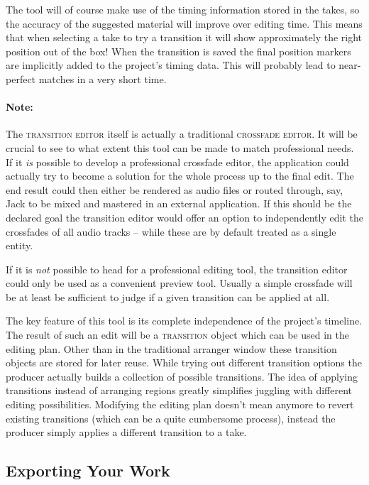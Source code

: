 \documentclass[11pt,a4paper]{article}
\newcommand*{\term}[1]{\textsc{#1}}
\begin{document}
The tool will of course make use of the timing information stored in the takes,
so the accuracy of the suggested material will improve over editing time.
This means that when selecting a take to try a transition it will show
approximately the right position out of the box!
When the transition is saved the final position markers are implicitly added
to the project's timing data. This will probably lead to near-perfect matches
in a very short time.

\paragraph{Note:}
The \term{transition editor} itself is actually a traditional \term{crossfade editor}.
It will be crucial to see to what extent this tool can be made to match
professional needs.
If it \emph{is} possible to develop a professional crossfade editor, the application
could actually try to become a solution for the whole process up to the final edit.
The end result could then either be rendered as audio files or routed through, say,
Jack to be mixed and mastered in an external application.
If this should be the declared goal the transition editor would offer an option to independently edit the crossfades of all audio tracks -- while these are by default
treated as a single entity.

If it is \emph{not} possible to head for a professional editing tool, the transition
editor could only be used as a convenient preview tool. Usually a simple crossfade 
will be at least be sufficient to judge if a given transition can be applied at all.

\medskip
The key feature of this tool is its complete independence of the
project's timeline.
The result of such an edit will be a \term{transition} object which can be used
in the editing plan. Other than in the traditional arranger window these transition
objects are stored for later reuse. While trying out different transition options
the producer actually builds a collection of possible transitions. The idea of
applying transitions instead of arranging regions greatly simplifies juggling with
different editing possibilities. Modifying the editing plan doesn't mean anymore to
revert existing transitions (which can be a quite cumbersome process), instead the
producer simply applies a different transition to a take.

\subsection{Exporting Your Work}
\end{document}
